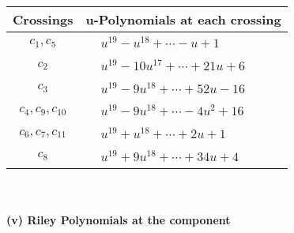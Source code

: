\documentclass[1p]{elsarticle_modified}
\theoremstyle{definition}
\begin{document}
\begin{tabular}{m{50pt}|m{274pt}}
Crossings & \hspace{64pt}u-Polynomials at each crossing \\
\hline $$\begin{aligned}c_{1},c_{5}\end{aligned}$$&$\begin{aligned}
&u^{19}- u^{18}+\cdots- u+1
\end{aligned}$\\
\hline $$\begin{aligned}c_{2}\end{aligned}$$&$\begin{aligned}
&u^{19}-10 u^{17}+\cdots+21 u+6
\end{aligned}$\\
\hline $$\begin{aligned}c_{3}\end{aligned}$$&$\begin{aligned}
&u^{19}-9 u^{18}+\cdots+52 u-16
\end{aligned}$\\
\hline $$\begin{aligned}c_{4},c_{9},c_{10}\end{aligned}$$&$\begin{aligned}
&u^{19}-9 u^{18}+\cdots-4 u^2+16
\end{aligned}$\\
\hline $$\begin{aligned}c_{6},c_{7},c_{11}\end{aligned}$$&$\begin{aligned}
&u^{19}+u^{18}+\cdots+2 u+1
\end{aligned}$\\
\hline $$\begin{aligned}c_{8}\end{aligned}$$&$\begin{aligned}
&u^{19}+9 u^{18}+\cdots+34 u+4
\end{aligned}$\\
\hline
\end{tabular}\\~\\
\newpage\renewcommand{\arraystretch}{1}
\flushleft \textbf{(v) Riley Polynomials at the component}\newline \\
\end{document}
